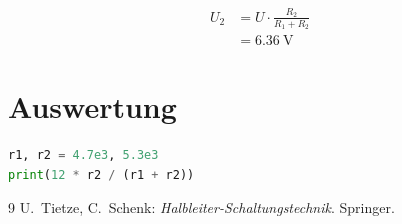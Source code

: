 \documentclass[11pt,a4paper]{article}
\begin{document}
\begin{tcolorbox}[title={Ergebnis}, colback=blue!5!white, colframe=blue!60!black]
\begin{align}
U_2 &= U \cdot \frac{R_2}{R_1 + R_2} \\
    &= \SI{6.36}{\volt}
\end{align}
\end{tcolorbox}

\section{Auswertung}
\begin{lstlisting}[language=Python, caption={Auswertung}]
r1, r2 = 4.7e3, 5.3e3
print(12 * r2 / (r1 + r2))
\end{lstlisting}

\begin{thebibliography}{9}
 U.~Tietze, C.~Schenk: \textit{Halbleiter-Schaltungstechnik}. Springer.
\end{thebibliography}
\end{document}
